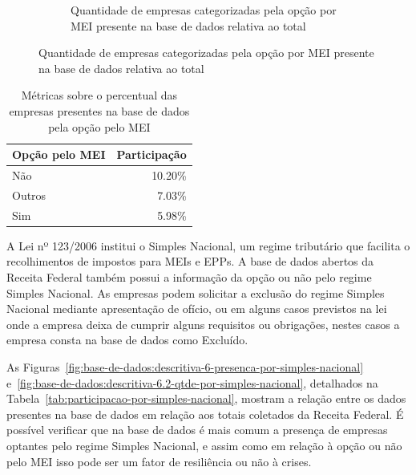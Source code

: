 \begin{figure}[htb]
\begin{subfigure}[b]{0.45\textwidth}
        \caption{Quantidade de empresas categorizadas pela opção por MEI presente na base de dados relativa ao total}
        \label{fig:base-de-dados:descritiva-5.2-qtde-por-mei}
    \end{subfigure}
    \fdadospesquisa
\end{figure}

\begin{table}[htb]
\centering
\caption{Métricas sobre o percentual das empresas presentes na base de dados pela opção pelo MEI}
\label{tab:participacao-por-mei}
\begin{tabular}{lr}
\toprule
Opção pelo MEI & Participação \\
\midrule
Não      &    10.20\% \\
Outros   &     7.03\% \\
Sim      &     5.98\% \\
\bottomrule
\end{tabular}
\fdadospesquisa
\end{table}

A Lei nº 123/2006 \cite{lei:123:lei-estatuto-mei-e-epp} institui o Simples Nacional, um regime tributário que facilita o recolhimentos de impostos para MEIs e EPPs. A base de dados abertos da Receita Federal também possui a informação da opção ou não pelo regime Simples Nacional. As empresas podem solicitar a exclusão do regime Simples Nacional mediante apresentação de ofício, ou em alguns casos previstos na lei onde a empresa deixa de cumprir alguns requisitos ou obrigações, nestes casos a empresa consta na base de dados como Excluído.

As Figuras~\ref{fig:base-de-dados:descritiva-6-presenca-por-simples-nacional} e~\ref{fig:base-de-dados:descritiva-6.2-qtde-por-simples-nacional}, detalhados na Tabela~\ref{tab:participacao-por-simples-nacional}, mostram a relação entre os dados presentes na base de dados em relação aos totais coletados da Receita Federal. É possível verificar que na base de dados é mais comum a presença de empresas optantes pelo regime Simples Nacional, e assim como em relação à opção ou não pelo MEI isso pode ser um fator de resiliência ou não à crises.

